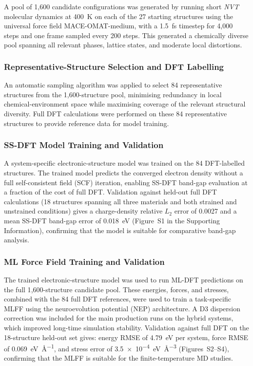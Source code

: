 A pool of 1{,}600 candidate configurations was generated by running
short \textit{NVT} molecular dynamics at \SI{400}{K} on each of
the 27 starting structures using the universal force field
MACE-OMAT-medium,\cite{ref_mace_omat} with a \SI{1.5}{fs}
timestep for 4{,}000 steps and one frame sampled every 200 steps.
This generated a chemically diverse pool spanning all relevant
phases, lattice states, and moderate local distortions.

\subsubsection{Representative-Structure Selection and DFT Labelling}

An automatic sampling algorithm was applied to select 84
representative structures from the 1{,}600-structure pool,
minimising redundancy in local chemical-environment space while
maximising coverage of the relevant structural diversity.
Full DFT calculations were performed on these 84 representative
structures to provide reference data for model training.

\subsubsection{SS-DFT Model Training and Validation}

A system-specific electronic-structure model was trained on the
84 DFT-labelled structures.
The trained model predicts the converged electron density without a
full self-consistent field (SCF) iteration, enabling SS-DFT
band-gap evaluation at a fraction of the cost of full DFT.
Validation against held-out full DFT calculations (18 structures
spanning all three materials and both strained and unstrained
conditions) gives a charge-density relative $L_2$ error of 0.0027
and a mean SS-DFT band-gap error of \SI{0.018}{eV}
(Figure~S1 in the Supporting Information), confirming that the
model is suitable for comparative band-gap analysis.

\subsubsection{ML Force Field Training and Validation}

The trained electronic-structure model was used to run ML-DFT
predictions on the full 1{,}600-structure candidate pool.
These energies, forces, and stresses, combined with the 84 full
DFT references, were used to train a task-specific MLFF using the
neuroevolution potential (NEP) architecture.\cite{ref_nep}
A D3 dispersion correction was included for the main production runs
on the hybrid systems, which improved long-time simulation
stability.
Validation against full DFT on the 18-structure held-out set gives:
energy RMSE of \SI{4.79}{eV} per system,
force RMSE of \SI{0.069}{eV\per\angstrom}, and
stress error of \SI{3.5e-4}{eV\per\cubic\angstrom}
(Figures~S2--S4), confirming that the MLFF is suitable for the
finite-temperature MD studies.

